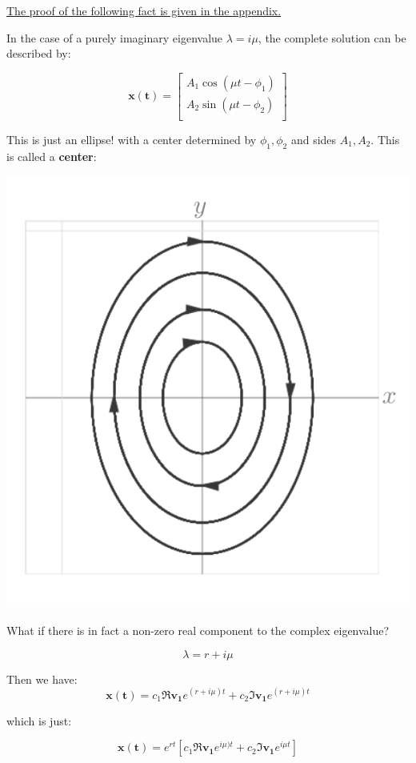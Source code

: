 \documentclass{report}
\begin{document}
\hyperref[sec:prCenter]{The proof of the following fact is given in the appendix.}


In the case of a purely imaginary eigenvalue $\lambda = i\mu$, the complete solution can be described by:

$$
\mathbf{x(t)} = 
\begin{bmatrix}
    A_1\cos(\mu t - \phi_1) \\ 
    A_2\sin(\mu t - \phi_2) \\
\end{bmatrix}
$$

This is just an ellipse! with a center determined by $\phi_1, \phi_2$ and sides $A_1, A_2$. This is called a \textbf{center}:


\includegraphics[scale=0.4]{center.png}


What if there is in fact a non-zero real component to the complex eigenvalue?

$$\lambda = r + i\mu$$

Then we have:
$$\mathbf{x(t)} = c_1\Re{\mathbf{v_1}e^{(r+i\mu) t}} + c_2\Im{\mathbf{v_1}e^{(r+i\mu) t}}$$

which is just:


$$\mathbf{x(t)} = e^{rt}[c_1\Re{\mathbf{v_1}e^{i\mu) t}} + c_2\Im{\mathbf{v_1}e^{i\mu t}}]$$
\end{document}

